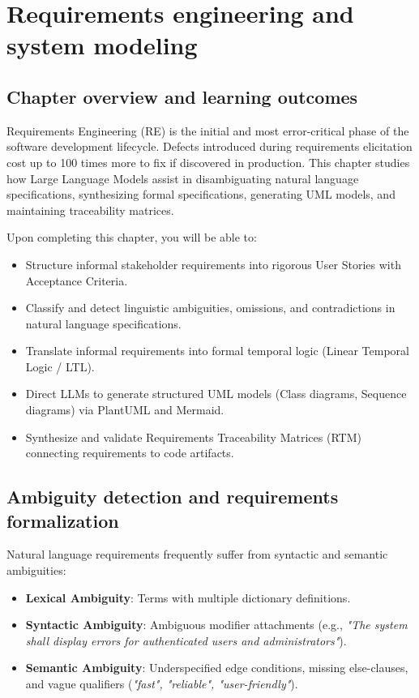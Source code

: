 \documentclass[../../main.tex]{subfiles}
\begin{document}
\chapter{Requirements engineering and system modeling}
\label{ch:requirements_engineering_modeling}

\section{Chapter overview and learning outcomes}
Requirements Engineering (RE) is the initial and most error-critical phase of the software development lifecycle. Defects introduced during requirements elicitation cost up to 100 times more to fix if discovered in production. This chapter studies how Large Language Models assist in disambiguating natural language specifications, synthesizing formal specifications, generating UML models, and maintaining traceability matrices.

Upon completing this chapter, you will be able to:
\begin{itemize}
    \item Structure informal stakeholder requirements into rigorous User Stories with Acceptance Criteria.
    \item Classify and detect linguistic ambiguities, omissions, and contradictions in natural language specifications.
    \item Translate informal requirements into formal temporal logic (Linear Temporal Logic / LTL).
    \item Direct LLMs to generate structured UML models (Class diagrams, Sequence diagrams) via PlantUML and Mermaid.
    \item Synthesize and validate Requirements Traceability Matrices (RTM) connecting requirements to code artifacts.
\end{itemize}

\section{Ambiguity detection and requirements formalization}
Natural language requirements frequently suffer from syntactic and semantic ambiguities:
\begin{itemize}
    \item \textbf{Lexical Ambiguity}: Terms with multiple dictionary definitions.
    \item \textbf{Syntactic Ambiguity}: Ambiguous modifier attachments (e.g., \emph{"The system shall display errors for authenticated users and administrators"}).
    \item \textbf{Semantic Ambiguity}: Underspecified edge conditions, missing else-clauses, and vague qualifiers (\emph{"fast", "reliable", "user-friendly"}).
\end{itemize}
\end{document}

